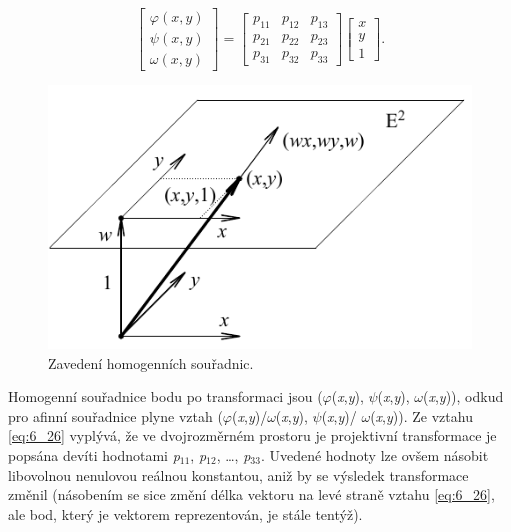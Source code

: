 \begin{equation} \label{eq:6_26} 
    \left[\begin{array}{c} {\varphi \left(x,y\right)} \\ {\psi \left(x,y\right)} \\ {\omega \left(x,y\right)} \end{array}\right]=\left[\begin{array}{ccc} {p_{11} } & {p_{12} } & {p_{13} } \\ {p_{21} } & {p_{22} } & {p_{23} } \\ {p_{31} } & {p_{32} } & {p_{33} } \end{array}\right]\left[\begin{array}{c} {x} \\ {y} \\ {1} \end{array}\right].  
\end{equation} 

\begin{figure}[th]
    \begin{center}
        \includegraphics[scale=1.0]{06_bodoveoperace/images/img_6_6.pdf}
    \end{center}
    \caption{Zavedení homogenních souřadnic.}
    \label{img:6_6}
\end{figure}

Homogenní souřadnice bodu po transformaci jsou ($\varphi$(\textit{x},\textit{y}), $\psi$(\textit{x},\textit{y}), $\omega$(\textit{x},\textit{y})), odkud pro afinní souřadnice plyne vztah ($\varphi$(\textit{x},\textit{y})/$\omega$(\textit{x},\textit{y}), $\psi$(\textit{x},\textit{y})/ $\omega$(\textit{x},\textit{y})). Ze vztahu \eqref{eq:6_26} vyplývá, že ve dvojrozměrném prostoru je projektivní transformace je popsána devíti hodnotami \textit{p}$_{11}$, \textit{p}$_{12}$, \dots, \textit{p}$_{33}$. Uvedené hodnoty lze ovšem násobit libovolnou  nenulovou reálnou konstantou, aniž by se výsledek transformace změnil (násobením se sice změní délka vektoru na levé straně vztahu \eqref{eq:6_26}, ale bod, který je vektorem reprezentován, je stále tentýž).

